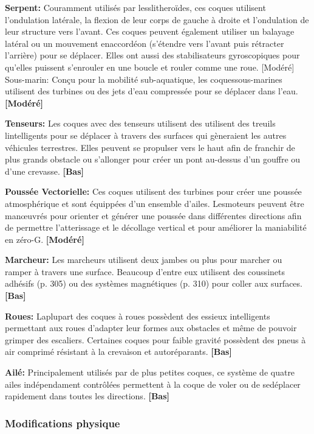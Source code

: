 {{\textbf{Serpent:} Couramment utilisés par lesslitheroïdes, ces coques utilisent l'ondulation latérale, la flexion de leur corps de gauche à droite et l'ondulation de leur structure vers l'avant. Ces coques peuvent également utiliser un balayage latéral ou un mouvement enaccordéon (s'étendre vers l'avant puis rétracter l'arrière) pour se déplacer. Elles ont aussi des stabilisateurs gyroscopiques pour qu'elles puissent s'enrouler en une boucle et rouler comme une roue. [Modéré] Sous-marin: Conçu pour la mobilité sub-aquatique, les coquessous-marines utilisent des turbines ou des jets d'eau compressée pour se déplacer dans l'eau. \textbf{[Modéré]} 

\textbf{Tenseurs:} Les coques avec des tenseurs utilisent des utilisent des treuils lintelligents pour se déplacer à travers des surfaces qui gèneraient les autres véhicules terrestres. Elles peuvent se propulser vers le haut afin de franchir de plus grands obstacle ou s'allonger pour créer un pont au-dessus d'un gouffre ou d'une crevasse. \textbf{[Bas]} 

\textbf{Poussée Vectorielle:} Ces coques utilisent des turbines pour créer une poussée atmosphérique et sont équippées d'un ensemble d'ailes. Lesmoteurs peuvent être manœuvrés pour orienter et générer une poussée dans différentes directions afin de permettre l'atterissage et le décollage vertical et pour améliorer la maniabilité en zéro-G. \textbf{[Modéré]} 

\textbf{Marcheur:} Les marcheurs utilisent deux jambes ou plus pour marcher ou ramper à travers une surface. Beaucoup d'entre eux utilisent des coussinets adhésifs (p. 305) ou des systèmes magnétiques (p. 310) pour coller aux surfaces. \textbf{[Bas]} 

\textbf{Roues:} Laplupart des coques à roues possèdent des essieux intelligents permettant aux roues d'adapter leur formes aux obstacles et même de pouvoir grimper des escaliers. Certaines coques pour faible gravité possèdent des pneus à air comprimé résistant à la crevaison et autoréparants. \textbf{[Bas]} 

\textbf{Ailé:} Principalement utilisés par de plus petites coques, ce système de quatre ailes indépendament contrôlées permettent à la coque de voler ou de sedéplacer rapidement dans toutes les directions. \textbf{[Bas]} 

\subsubsection{Modifications physique} 

}}
